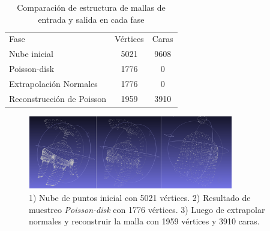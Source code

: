 \begin{table}
\begin{center}
\begin{tabular}{|l||cc|} \hline
	Fase & Vértices & Caras \\
	Nube inicial & 5021 & 9608 \\
	Poisson-disk & 1776 & 0 \\
	Extrapolación Normales & 1776 & 0 \\
	Reconstrucción de Poisson & 1959 & 3910 \\ \hline %
\end{tabular}
\caption{Comparación de estructura de mallas de entrada y salida en cada fase}
\end{center}
\end{table}

\begin{figure}[H]
  \centering
    \includegraphics[width=0.8\textwidth]{./Cap6_reconstruccion/malla-nubepuntos.png}
  \caption{1) Nube de puntos inicial con 5021 vértices. 2) Resultado de muestreo \emph{Poisson-disk} con 1776 vértices. 3) Luego de extrapolar normales y reconstruir la malla con 1959 vértices y 3910 caras.}
  \label{fig:Mesh-Results}
\end{figure}
 
